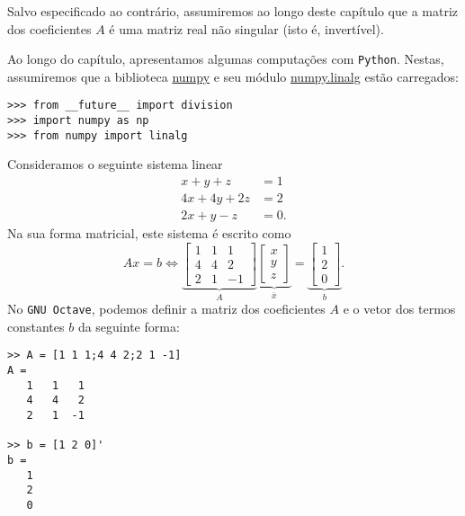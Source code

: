 Salvo especificado ao contrário, assumiremos ao longo deste capítulo que a matriz dos coeficientes $A$ é uma matriz real não singular (isto é, invertível).

\ifispython
Ao longo do capítulo, apresentamos algumas computações com \verb+Python+. Nestas, assumiremos que a biblioteca \href{http://www.numpy.org/}{numpy} e seu módulo \href{https://docs.scipy.org/doc/numpy/reference/routines.linalg.html}{numpy.linalg} estão carregados:
\begin{verbatim}
>>> from __future__ import division
>>> import numpy as np
>>> from numpy import linalg
\end{verbatim}
\fi

\begin{ex}
  Consideramos o seguinte sistema linear
  \begin{equation}
    \begin{split}
      x+y+z  &= 1\\
      4x+4y+2z&= 2\\
      2x+y-z &= 0.
    \end{split}
  \end{equation}
Na sua forma matricial, este sistema é escrito como
\begin{equation}
  Ax = b \Leftrightarrow
  \underbrace{\begin{bmatrix}
    1 & 1 & 1\\
    4 & 4 & 2\\
    2 & 1 & -1
  \end{bmatrix}}_{A}
\underbrace{
  \begin{bmatrix}
    x\\y\\z
  \end{bmatrix}
}_{\overline{x}} =
\underbrace{
  \begin{bmatrix}
    1\\2\\0
  \end{bmatrix}}_{b}.
\end{equation}
\ifisoctave
No \verb+GNU Octave+, podemos definir a matriz dos coeficientes $A$ e o vetor dos termos constantes $b$ da seguinte forma:
\begin{verbatim}
>> A = [1 1 1;4 4 2;2 1 -1]
A =
   1   1   1
   4   4   2
   2   1  -1

>> b = [1 2 0]'
b =
   1
   2
   0
\end{verbatim}
\fi


\end{ex}
